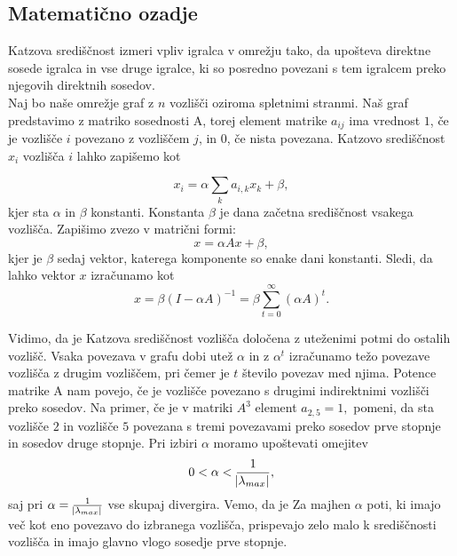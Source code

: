 \documentclass[a4paper]{article}
\begin{document}
\subsection{Matematično ozadje}


\hspace{4.8mm}Katzova središčnost izmeri vpliv igralca v omrežju tako, da upošteva direktne sosede igralca in vse druge igralce, ki so posredno povezani s tem igralcem preko njegovih direktnih sosedov. \\
Naj bo naše omrežje graf z $n$ vozlišči oziroma spletnimi stranmi. Naš graf predstavimo z matriko sosednosti A, torej element matrike $a_{ij}$ ima vrednost $1$, če je vozlišče $i$ povezano z vozliščem $j$, in $0$, če nista povezana. Katzovo središčnost $x_{i}$ vozlišča $i$ lahko zapišemo kot

$$x_{i} = \alpha\sum_{k}a_{i,k}x_{k} + \beta,$$
kjer sta $\alpha$ in $\beta$ konstanti. Konstanta $\beta$ je dana začetna središčnost vsakega vozlišča. Zapišimo zvezo v matrični formi:
$$x = \alpha Ax + \beta,$$
kjer je $\beta$ sedaj vektor, katerega komponente so enake dani konstanti. Sledi, da lahko vektor $x$ izračunamo kot
$$x = \beta (I - \alpha A)^{-1} = \beta \sum_{t=0}^{\infty} (\alpha A)^t. $$

Vidimo, da je Katzova središčnost vozlišča določena z uteženimi potmi do ostalih vozlišč. Vsaka povezava v grafu dobi utež $\alpha$ in z $\alpha^{t}$ izračunamo težo povezave vozlišča z drugim vozliščem, pri čemer je $t$ število povezav med njima. Potence matrike A nam povejo, če je vozlišče povezano s drugimi indirektnimi vozlišči preko sosedov. Na primer, če je v matriki $A^{3}$ element $a_{2,5}  = 1,$ pomeni, da sta vozlišče $2$ in vozlišče $5$ povezana s tremi povezavami preko sosedov prve stopnje in sosedov druge stopnje.
Pri izbiri $\alpha$ moramo upoštevati omejitev 
$$0 < \alpha < \frac{1}{\abs{\lambda_{max}}},$$
saj pri $\alpha = \frac{1}{\abs{\lambda_{max}}}$ vse skupaj divergira. Vemo, da je Za majhen $\alpha$ poti, ki imajo več kot eno povezavo do izbranega vozlišča, prispevajo zelo malo k središčnosti vozlišča in imajo glavno vlogo sosedje prve stopnje.
\end{document}
